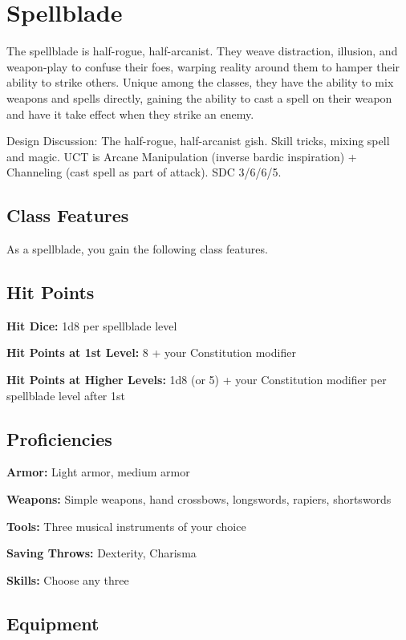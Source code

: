 \section{Spellblade}\label{class:spellblade}

The spellblade is half-rogue, half-arcanist. They weave distraction, illusion, and weapon-play to confuse their foes, warping reality around them to hamper their ability to strike others. Unique among the classes, they have the ability to mix weapons and spells directly, gaining the ability to cast a spell on their weapon and have it take effect when they strike an enemy.

Design Discussion: The half-rogue, half-arcanist gish. Skill tricks, mixing spell and magic. UCT is Arcane Manipulation (inverse bardic inspiration) + Channeling (cast spell as part of attack). SDC 3/6/6/5.

\subsection{Class Features}

As a spellblade, you gain the following class features.

\subsection{Hit Points}

\textbf{Hit Dice:} 1d8 per spellblade level

\textbf{Hit Points at 1st Level:} 8 + your Constitution modifier

\textbf{Hit Points at Higher Levels:} 1d8 (or 5) + your Constitution modifier per spellblade level after 1st

\subsection{Proficiencies}

\textbf{Armor:} Light armor, medium armor

\textbf{Weapons:} Simple weapons, hand crossbows, longswords, rapiers, shortswords

\textbf{Tools:} Three musical instruments of your choice

\textbf{Saving Throws:} Dexterity, Charisma

\textbf{Skills:} Choose any three

\subsection{Equipment}


